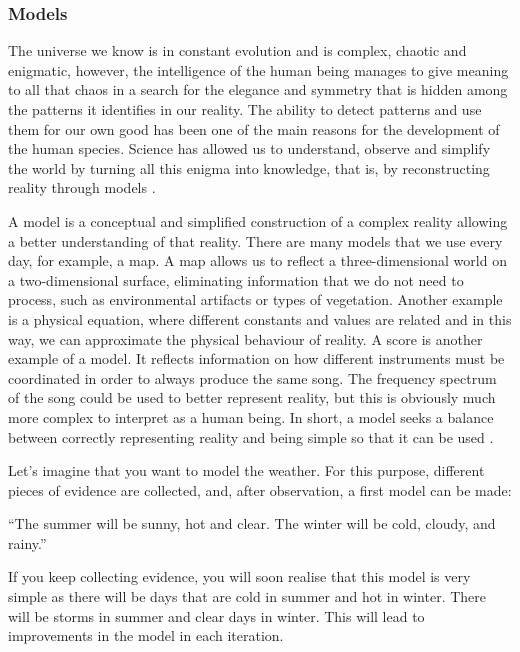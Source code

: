 \subsubsection{Models}\label{models}

The universe we know is in constant evolution and is complex, chaotic and enigmatic, however, the intelligence of the human being manages to give meaning to all that chaos in a search for the elegance and symmetry that is hidden among the patterns it identifies in our reality. The ability to detect patterns and use them for our own good has been one of the main reasons for the development of the human species. Science has allowed us to understand, observe and simplify the world by turning all this enigma into knowledge, that is, by reconstructing reality through models \cite{marlie}.
\newline

A model is a conceptual and simplified construction of a complex reality allowing a better understanding of that reality. There are many models that we use every day, for example, a map. A map allows us to reflect a three-dimensional world on a two-dimensional surface, eliminating information that we do not need to process, such as environmental artifacts or types of vegetation. Another example is a physical equation, where different constants and values are related and in this way, we can approximate the physical behaviour of reality. A score is another example of a model. It reflects information on how different instruments must be coordinated in order to always produce the same song. The frequency spectrum of the song could be used to better represent reality, but this is obviously much more complex to interpret as a human being. In short, a model seeks a balance between correctly representing reality and being simple so that it can be used \cite{kuhne}.
\newline

Let's imagine that you want to model the weather. For this purpose, different pieces of evidence are collected, and, after observation, a first model can be made:

\begin{displayquote}
“The summer will be sunny, hot and clear. The winter will be cold, cloudy, and rainy.”
\end{displayquote}

If you keep collecting evidence, you will soon realise that this model is very simple as there will be days that are cold in summer and hot in winter. There will be storms in summer and clear days in winter. This will lead to improvements in the model in each iteration.
\newline


